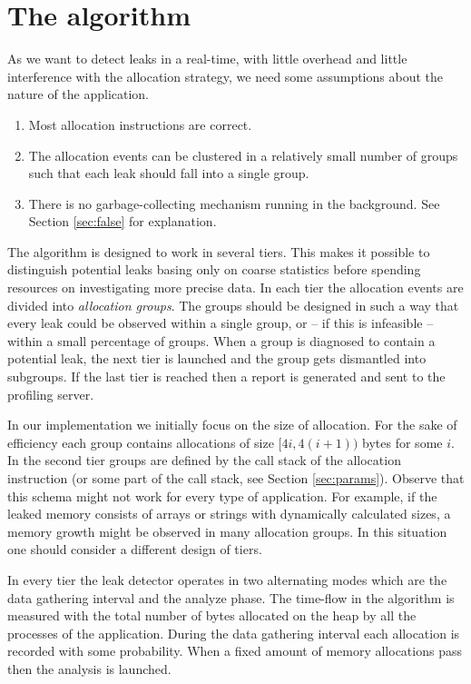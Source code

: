 \documentclass[preprint, numbers]{sigplanconf}
\begin{document}
\section{The algorithm}

As we want to detect leaks in a real-time, with little overhead and little interference with
the allocation strategy, we need some assumptions about the nature of the application.

\begin{enumerate}
\item Most allocation instructions are correct.
\item The allocation events can be clustered in a relatively small number of groups
	such that each leak should fall into a single group.
\item There is no garbage-collecting mechanism running in the background.
	See Section \ref{sec:false} for explanation.
\end{enumerate}

The algorithm is designed to work in several tiers.
This makes it possible to distinguish potential leaks basing only on coarse statistics before spending resources on investigating more
precise data.
In each tier the allocation events are divided into \textit{allocation groups}.
The groups should be designed in such a way that every leak could be observed within a single group,
or -- if this is infeasible -- within a small percentage of groups.
When a group is diagnosed to contain a potential leak, the next tier is launched and the group gets dismantled
into subgroups.
If the last tier is reached then a report is generated and sent to the profiling server.

In our implementation we initially focus on the size of allocation.
For the sake of efficiency each group contains allocations of size $[4i, 4(i+1))$ bytes for some $i$.
In the second tier groups are defined by the call stack of the allocation instruction
(or some part of the call stack, see Section \ref{sec:params}).
Observe that this schema might not work for every type of application.
For example, if the leaked memory consists of arrays or strings with dynamically calculated sizes,
a memory growth might be observed in many allocation groups.
In this situation one should consider a different design of tiers.

In every tier the leak detector operates in two alternating modes which are
the data gathering interval and the analyze phase.
The time-flow in the algorithm is measured with the total number of bytes allocated on the heap
by all the processes of the application.
During the data gathering interval each allocation is recorded with some
probability.
When a fixed amount of memory allocations pass then the analysis is launched.
\end{document}
